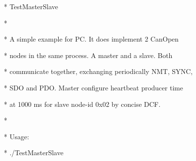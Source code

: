 \documentclass[a4paper,12pt]{book}
\begin{document}
{\ttfamily
* \space TestMasterSlave
\space \space \space \space \space \space \space \space \space \space \space \space \space \space \space \space \space \space \space \space \space \space \space \space \space \space \space \space \space \space \space \space \space \space \space \space \space \space \space \space \space \space *}

{\ttfamily
*
\space \space \space \space \space \space \space \space \space \space \space \space \space \space \space \space \space \space \space \space \space \space \space \space \space \space \space \space \space \space \space \space \space \space \space \space \space \space \space \space \space \space \space \space \space \space \space \space \space \space \space \space \space \space \space \space \space \space \space *}

{\ttfamily
* \space A simple example for PC. It does implement 2 CanOpen \space \space \space \space \space *}

{\ttfamily
* \space nodes in the same process. A master and a slave. Both \space \space \space \space *}

{\ttfamily
* \space communicate together, exchanging periodically NMT, SYNC, \space *}

{\ttfamily
* \space SDO and PDO. Master configure heartbeat producer time \space \space \space \space *}

{\ttfamily
* \space at 1000 ms for slave node{}-id 0x02 by concise DCF.
\space \space \space \space \space \space \space \space *}

{\ttfamily
*
\space \space \space \space \space \space \space \space \space \space \space \space \space \space \space \space \space \space \space \space \space \space \space \space \space \space \space \space \space \space \space \space \space \space \space \space \space \space \space \space \space \space \space \space \space \space \space \space \space \space \space \space \space \space \space \space \space \space \space *}

{\ttfamily
* \space \space Usage:
\space \space \space \space \space \space \space \space \space \space \space \space \space \space \space \space \space \space \space \space \space \space \space \space \space \space \space \space \space \space \space \space \space \space \space \space \space \space \space \space \space \space \space \space \space \space \space \space \space \space *}

{\ttfamily
* \space \space ./TestMasterSlave \space [OPTIONS]
\space \space \space \space \space \space \space \space \space \space \space \space \space \space \space \space \space \space \space \space \space \space \space \space \space \space \space \space *}
\end{document}
